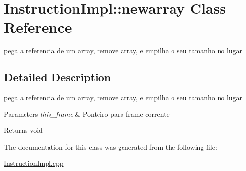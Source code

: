 \hypertarget{class_instruction_impl_1_1newarray}{}\section{Instruction\+Impl\+:\+:newarray Class Reference}
\label{class_instruction_impl_1_1newarray}


pega a referencia de um array, remove array, e empilha o seu tamanho no lugar  




\subsection{Detailed Description}
pega a referencia de um array, remove array, e empilha o seu tamanho no lugar 


\begin{DoxyParams}{Parameters}
{\em this\+\_\+frame} & Ponteiro para frame corrente \\
\hline
\end{DoxyParams}
\begin{DoxyReturn}{Returns}
void 
\end{DoxyReturn}


The documentation for this class was generated from the following file\+:\begin{DoxyCompactItemize}
\item 
\hyperlink{_instruction_impl_8cpp}{Instruction\+Impl.\+cpp}\end{DoxyCompactItemize}
